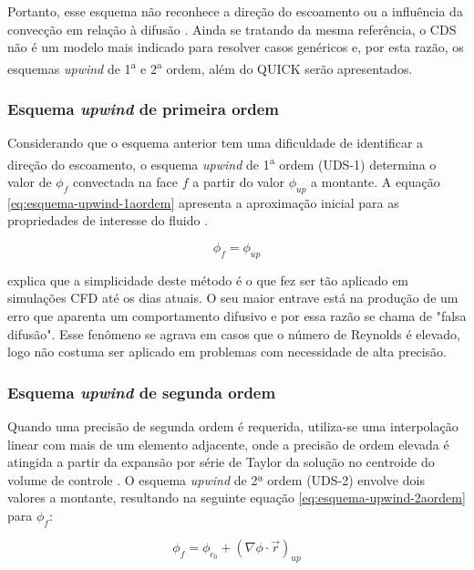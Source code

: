 Portanto, esse esquema não reconhece a direção do escoamento ou a influência da convecção em relação à difusão \cite{malalasekera2007}. Ainda se tratando da mesma referência, o CDS não é um modelo mais indicado para resolver casos genéricos e, por esta razão, os esquemas \textit{upwind} de 1\textsuperscript{a} e 2\textsuperscript{a} ordem, além do QUICK serão apresentados.

\subsubsection{Esquema \textit{upwind} de primeira ordem}

Considerando que o esquema anterior tem uma dificuldade de identificar a direção do escoamento, o esquema \textit{upwind} de 1\textsuperscript{a} ordem (UDS-1) determina o valor de \(\phi_f\) convectada na face \(f\) a partir do valor \(\phi_{up}\) a montante. A equação \ref{eq:esquema-upwind-1aordem} apresenta a aproximação inicial para as propriedades de interesse do fluido \cite{Rezende2009}.

\begin{equation}\label{eq:esquema-upwind-1aordem}
	\phi_f = \phi_{up}
\end{equation}

\citeauthor{malalasekera2007} explica que a simplicidade deste método é o que fez ser tão aplicado em simulações CFD até os dias atuais. O seu maior entrave está na produção de um erro que aparenta um comportamento difusivo e por essa razão se chama de "falsa difusão". Esse fenômeno se agrava em casos que o número de Reynolds é elevado, logo não costuma ser aplicado em problemas com necessidade de alta precisão.

\subsubsection{Esquema \textit{upwind} de segunda ordem}

Quando uma precisão de segunda ordem é requerida, utiliza-se uma interpolação linear com mais de um elemento adjacente, onde a precisão de ordem elevada é atingida a partir da expansão por série de Taylor da solução no centroide do volume de controle \cite{Rezende2009}. O esquema \textit{upwind} de 2ª ordem (UDS-2) envolve dois valores a montante, resultando na seguinte equação \ref{eq:esquema-upwind-2aordem} para \(\phi_f\):

\begin{equation} \label{eq:esquema-upwind-2aordem}
    \phi_f = \phi_{c_0} + \left(\nabla\phi\cdot\overrightarrow{r}\right)_{up}
\end{equation}

